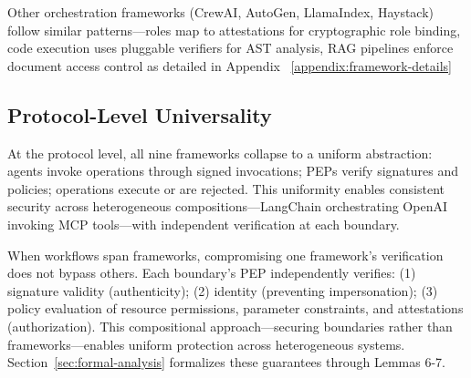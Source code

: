 Other orchestration frameworks (CrewAI, AutoGen, LlamaIndex, Haystack) follow similar patterns—roles map to attestations for cryptographic role binding, code execution uses pluggable verifiers for AST analysis, RAG pipelines enforce document access control as detailed in Appendix ~\ref{appendix:framework-details} 

\subsection{Protocol-Level Universality}
At the protocol level, all nine frameworks collapse to a uniform abstraction: agents invoke operations through signed invocations; PEPs verify signatures and policies; operations execute or are rejected. This uniformity enables consistent security across heterogeneous compositions—LangChain orchestrating OpenAI invoking MCP tools—with independent verification at each boundary.

When workflows span frameworks, compromising one framework's verification does not bypass others. Each boundary's PEP independently verifies: (1) signature validity (authenticity); (2) identity (preventing impersonation); (3) policy evaluation of resource permissions, parameter constraints, and attestations (authorization). This compositional approach—securing boundaries rather than frameworks—enables uniform protection across heterogeneous systems. Section~\ref{sec:formal-analysis} formalizes these guarantees through Lemmas 6-7.




